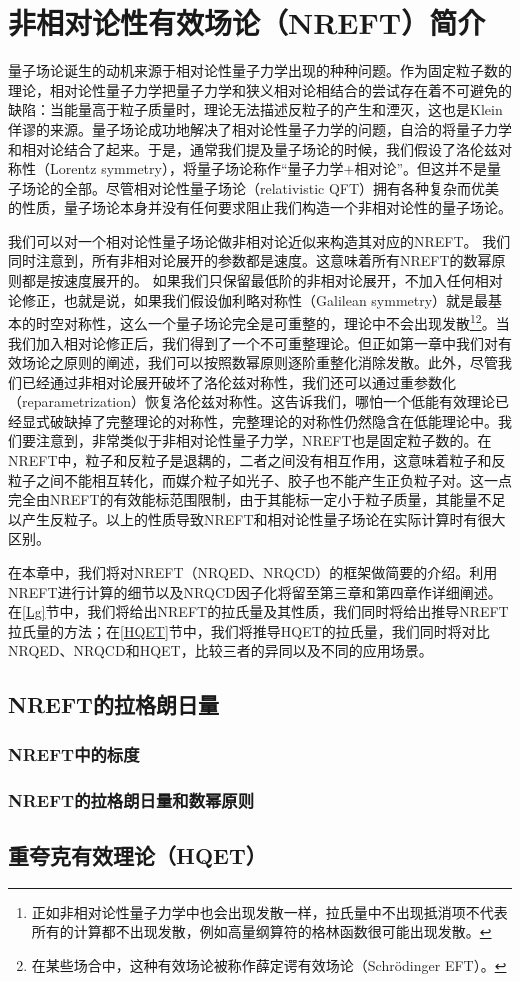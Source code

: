 \chapter{非相对论性有效场论（NREFT）简介\label{chap_NREFT}}
量子场论诞生的动机来源于相对论性量子力学出现的种种问题。作为固定粒子数的理论，相对论性量子力学把量子力学和狭义相对论相结合的尝试存在着不可避免的缺陷：当能量高于粒子质量时，理论无法描述反粒子的产生和湮灭，这也是Klein佯谬的来源。量子场论成功地解决了相对论性量子力学的问题，自洽的将量子力学和相对论结合了起来。于是，通常我们提及量子场论的时候，我们假设了洛伦兹对称性（Lorentz symmetry），将量子场论称作“量子力学+相对论”。但这并不是量子场论的全部。尽管相对论性量子场论（relativistic QFT）拥有各种复杂而优美的性质，量子场论本身并没有任何要求阻止我们构造一个非相对论性的量子场论。

我们可以对一个相对论性量子场论做非相对论近似来构造其对应的NREFT。
我们同时注意到，所有非相对论展开的参数都是速度。这意味着所有NREFT的数幂原则都是按速度展开的。
如果我们只保留最低阶的非相对论展开，不加入任何相对论修正，也就是说，如果我们假设伽利略对称性（Galilean symmetry）就是最基本的时空对称性，这么一个量子场论完全是可重整的，理论中不会出现发散\footnote{正如非相对论性量子力学中也会出现发散一样，拉氏量中不出现抵消项不代表所有的计算都不出现发散，例如高量纲算符的格林函数很可能出现发散。}\footnote{在某些场合中，这种有效场论被称作薛定谔有效场论（Schr\"odinger EFT）。}。当我们加入相对论修正后，我们得到了一个不可重整理论。但正如第一章中我们对有效场论之原则的阐述，我们可以按照数幂原则逐阶重整化消除发散。此外，尽管我们已经通过非相对论展开破坏了洛伦兹对称性，我们还可以通过重参数化（reparametrization）恢复洛伦兹对称性。这告诉我们，哪怕一个低能有效理论已经显式破缺掉了完整理论的对称性，完整理论的对称性仍然隐含在低能理论中。我们要注意到，非常类似于非相对论性量子力学，NREFT也是固定粒子数的。在NREFT中，粒子和反粒子是退耦的，二者之间没有相互作用，这意味着粒子和反粒子之间不能相互转化，而媒介粒子如光子、胶子也不能产生正负粒子对。这一点完全由NREFT的有效能标范围限制，由于其能标一定小于粒子质量，其能量不足以产生反粒子。以上的性质导致NREFT和相对论性量子场论在实际计算时有很大区别。


在本章中，我们将对NREFT（NRQED、NRQCD）的框架做简要的介绍。利用NREFT进行计算的细节以及NRQCD因子化将留至第三章和第四章作详细阐述。在\ref{Lg}节中，我们将给出NREFT的拉氏量及其性质，我们同时将给出推导NREFT拉氏量的方法；在\ref{HQET}节中，我们将推导HQET的拉氏量，我们同时将对比NRQED、NRQCD和HQET，比较三者的异同以及不同的应用场景。

\section{NREFT的拉格朗日量\label{Lg}}
\subsection{NREFT中的标度}


\subsection{NREFT的拉格朗日量和数幂原则}

\section{重夸克有效理论（HQET）\label{HQET}}